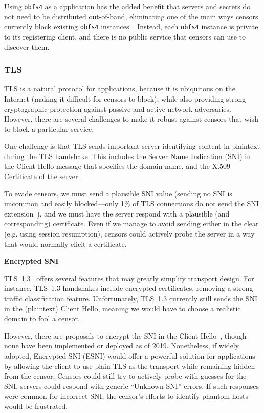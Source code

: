 \documentclass[sigconf]{acmart}
\renewcommand{\paragraph}[1]{\smallskip\noindent\textbf{#1\quad}}
\begin{document}
Using \texttt{obfs4} as a \scheme application has the added benefit that servers
and secrets do not need to be distributed out-of-band, eliminating one of the
main ways censors currently block existing \texttt{obfs4}
instances~\cite{tor-bridge-blocking-blog}. Instead, each \scheme \texttt{obfs4}
instance is private to its registering client, and there is no public service
that censors can use to discover them.



\subsubsection{TLS}

TLS is a natural protocol for \scheme applications, because it is ubiquitous on
the Internet (making it difficult for censors to block), while also providing
strong cryptographic protection against passive and active network adversaries.
However, there are several challenges to make it robust against censors that
wish to block a particular service.

One challenge is that TLS sends important server-identifying content in plaintext
during the TLS handshake. This includes the Server Name Indication (SNI) in the
Client Hello message that specifies the domain name, and the
X.509 Certificate of the server.

To evade censors, we must send a plausible SNI value (sending no SNI is
uncommon and easily blocked---only 1\% of TLS connections
do not send the SNI extension~\cite{tls-fingerprint}), and we must have the server respond with
a plausible (and corresponding) certificate. Even if we manage to avoid sending
either in the clear (e.g. using session resumption), censors could actively probe
the server in a way that would normally elicit a certificate.


\paragraph{Encrypted SNI}
\label{esni}

TLS~1.3~\cite{tls13} offers several features that may greatly simplify 
\scheme transport design. For instance, TLS~1.3 handshakes include encrypted
certificates, removing a strong traffic classification feature.
Unfortunately, TLS~1.3 currently still sends the SNI in the (plaintext) Client
Hello, meaning we would have to choose a realistic domain to fool a censor.

However, there are proposals to encrypt the SNI in the Client Hello~\cite{ietf-tls-esni-02},
though none have been implemented or deployed as of 2019. Nonetheless,
if widely adopted, Encrypted SNI (ESNI) would offer a powerful solution for
\scheme applications by allowing the client to use plain TLS as the transport
while remaining hidden from the censor.
Censors could still try to actively probe with guesses for the SNI,
servers could respond with generic ``Unknown SNI'' errors. If such responses
were common for incorrect SNI, the censor's efforts to identify phantom hosts
would be frustrated.
\end{document}
